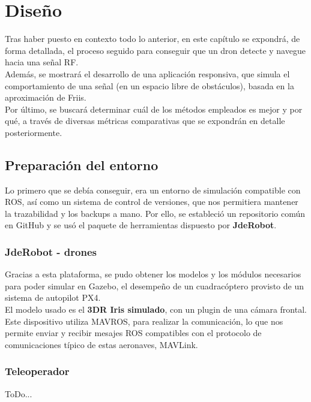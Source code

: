 \chapter{Diseño}
\label{cap:capitulo4}

Tras haber puesto en contexto todo lo anterior, en este capítulo se expondrá, de forma detallada, el proceso seguido para conseguir que un dron detecte y navegue hacia una señal \ac{RF}.\\

Además, se mostrará el desarrollo de una aplicación responsiva, que simula el comportamiento de una señal (en un espacio libre de obstáculos), basada en la aproximación de Friis.\\

Por último, se buscará determinar cuál de los métodos empleados es mejor y por qué, a través de diversas métricas comparativas que se expondrán en detalle posteriormente.\\

\section{Preparación del entorno}
\label{sec:preparacion_del_entorno}

Lo primero que se debía conseguir, era un entorno de simulación compatible con \ac{ROS}, así como un sistema de control de versiones, que nos permitiera mantener la trazabilidad y los backups a mano. Por ello, se estableció un repositorio común en GitHub y se usó el paquete de herramientas dispuesto por \textbf{JdeRobot}.

\subsection{JdeRobot - drones}
\label{subsec:jderobot_drones}

Gracias a esta plataforma, se pudo obtener los modelos y los módulos necesarios para poder simular en Gazebo, el desempeño de un cuadracóptero provisto de un sistema de autopilot PX4.\\

El modelo usado es el \textbf{3DR Iris simulado}, con un plugin de una cámara frontal. Este dispositivo utiliza MAVROS, para realizar la comunicación, lo que nos permite enviar y recibir mesajes ROS compatibles con el protocolo de comunicaciones típico de estas aeronaves, MAVLink.\\

\subsection{Teleoperador}
\label{subsec:teleoperador}

ToDo...

